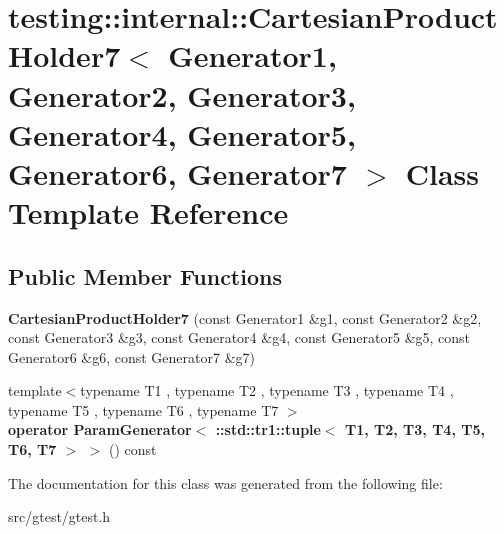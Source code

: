 \hypertarget{classtesting_1_1internal_1_1_cartesian_product_holder7}{}\section{testing\+:\+:internal\+:\+:Cartesian\+Product\+Holder7$<$ Generator1, Generator2, Generator3, Generator4, Generator5, Generator6, Generator7 $>$ Class Template Reference}
\label{classtesting_1_1internal_1_1_cartesian_product_holder7}
\subsection*{Public Member Functions}
\begin{DoxyCompactItemize}
\item 
\mbox{\label{classtesting_1_1internal_1_1_cartesian_product_holder7_a289e661f9252bac3570700410eb041b3}} 
{\bfseries Cartesian\+Product\+Holder7} (const Generator1 \&g1, const Generator2 \&g2, const Generator3 \&g3, const Generator4 \&g4, const Generator5 \&g5, const Generator6 \&g6, const Generator7 \&g7)
\item 
\mbox{\label{classtesting_1_1internal_1_1_cartesian_product_holder7_a276e16d18429e53beb8e8126ce5c016e}} 
{\footnotesize template$<$typename T1 , typename T2 , typename T3 , typename T4 , typename T5 , typename T6 , typename T7 $>$ }\\{\bfseries operator Param\+Generator$<$ \+::std\+::tr1\+::tuple$<$ T1, T2, T3, T4, T5, T6, T7 $>$ $>$} () const
\end{DoxyCompactItemize}


The documentation for this class was generated from the following file\+:\begin{DoxyCompactItemize}
\item 
src/gtest/gtest.\+h\end{DoxyCompactItemize}
